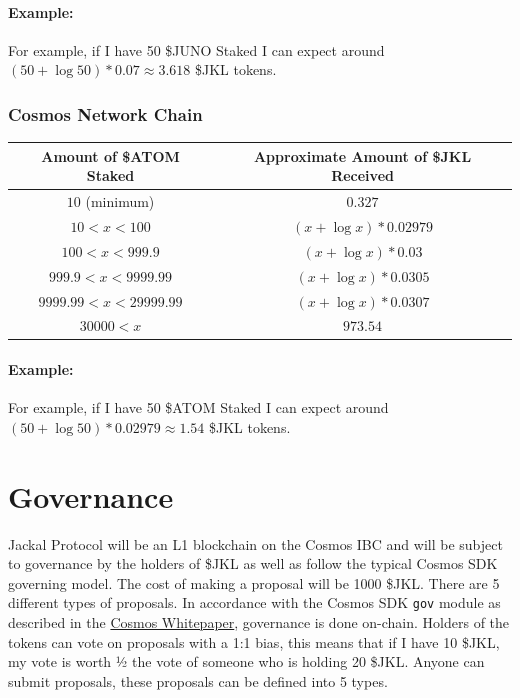 \documentclass[11pt, nofootinbib]{article}
\begin{document}
\paragraph{Example:}

For example, if I have 50 \$JUNO Staked I can expect around $(50+\log 50)*0.07\approx3.618$ \$JKL tokens. 

\subsubsection{Cosmos Network Chain}
\begin{center}
\begin{tabular}{|c|c|}
\hline
\rowcolor{Black!80}
\color{White}Amount of \$ATOM Staked & \color{White}Approximate Amount of \$JKL Received \\
\hline
\hline
$10$ (minimum) & $ 0.327$ \\
\hline
\rowcolor{Black!10}
$10<x<100$ & ${(x+\log x)*0.02979}$ \\
\hline
$100<x<999.9$ & ${(x+\log x)*0.03}$ \\
\hline
\rowcolor{Black!10}
$999.9<x<9999.99$ & ${(x+\log x)*0.0305}$ \\
\hline
$9999.99<x<29999.99$ & ${(x+\log x)*0.0307}$ \\
\hline
\rowcolor{Black!10}
$30000<x$ & $973.54$ \\
\hline
\end{tabular}
\end{center}

\paragraph{Example:}

For example, if I have 50 \$ATOM Staked I can expect around $(50+\log 50)*0.02979\approx1.54$ \$JKL tokens. 

\section{Governance}
Jackal Protocol will be an L1 blockchain on the Cosmos IBC and will be subject to governance by the holders of
\$JKL as well as follow the typical Cosmos SDK governing model. The cost of making a proposal will be 1000
\$JKL. There are 5 different types of proposals.
In accordance with the Cosmos SDK \verb|gov| module as described in the \href{https://v1.cosmos.network/resources/whitepaper}{Cosmos Whitepaper}, governance is
done on-chain. Holders of the tokens can vote on proposals with a 1:1 bias, this means that if I have 10 \$JKL,
my vote is worth ½ the vote of someone who is holding 20 \$JKL. Anyone can submit proposals, these
proposals can be defined into 5 types.
\end{document}
